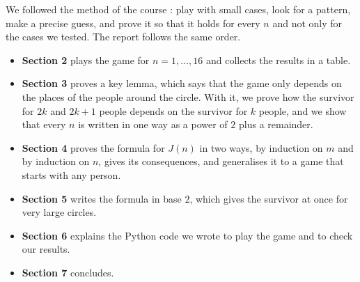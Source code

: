 We followed the method of the course \cite{course2026}: play with small
cases, look for a pattern, make a precise guess, and prove it so that it holds
for every $n$ and not only for the cases we tested. The report follows the
same order.
\begin{itemize}
  \item \textbf{Section 2} plays the game for $n=1,\dots,16$ and collects the
        results in a table.
  \item \textbf{Section 3} proves a key lemma, which says that the game only
        depends on the places of the people around the circle. With it, we
        prove how the survivor for $2k$ and $2k+1$ people depends on the
        survivor for $k$ people, and we show that every $n$ is written in one
        way as a power of $2$ plus a remainder.
  \item \textbf{Section 4} proves the formula for $J(n)$ in two ways, by
        induction on $m$ and by induction on $n$, gives its consequences, and
        generalises it to a game that starts with any person.
  \item \textbf{Section 5} writes the formula in base $2$, which gives the
        survivor at once for very large circles.
  \item \textbf{Section 6} explains the Python code we wrote to play the game
        and to check our results.
  \item \textbf{Section 7} concludes.
\end{itemize}
